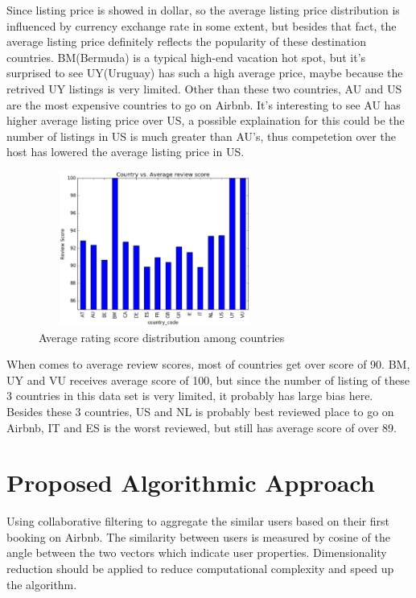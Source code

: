 \documentclass{sig-alternate-05-2015}
\begin{document}
Since listing price is showed in dollar, so the average listing price distribution is influenced by currency exchange rate in some extent, but besides that fact, the average listing price definitely reflects the popularity of these destination countries. BM(Bermuda) is a typical high-end vacation hot spot, but it's surprised to see UY(Uruguay) has such a high average price, maybe because the retrived UY listings is very limited. Other than these two countries, AU and US are the most expensive countries to go on Airbnb. It's interesting to see AU has higher average listing price over US, a possible explaination for this could be the number of listings in US is much greater than AU's, thus competetion over the host has lowered the average listing price in US.

\begin{figure}
\centering
\includegraphics[height=2in, width=3in]{country-avgRating}
\caption{Average rating score distribution among countries}
\end{figure}

When comes to average review scores, most of countries get over score of 90. BM, UY and VU receives average score of 100, but since the number of listing of these 3 countries in this data set is very limited, it probably has large bias here. Besides these 3 countries, US and NL is probably best reviewed place to go on Airbnb, IT and ES is the worst reviewed, but still has average score of over 89.

\FloatBarrier
\section{Proposed Algorithmic Approach}
Using collaborative filtering to aggregate the similar users based on their first booking on Airbnb. The similarity between users is measured by cosine of the angle between the two vectors which indicate user properties. Dimensionality reduction should be applied to reduce computational complexity and speed up the algorithm.
\end{document}
